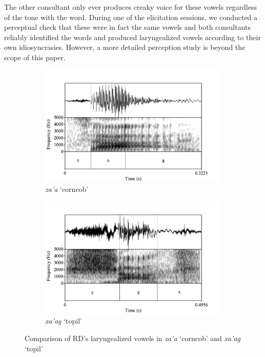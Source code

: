 \documentclass[12pt, letterpaper]{article}
\begin{document}
The other consultant only ever produces creaky voice for these vowels regardless of the tone with the word. During one of the elicitation sessions, we conducted a perceptual check that these were in fact the same vowels and both consultants reliably identified the words and produced laryngealized vowels according to their own idiosyncrasies. However, a more detailed perception study is beyond the scope of this paper. 
\begin{figure}[!h]
	\centering
	\begin{subfigure}{.5\textwidth}
		\centering
		\includegraphics[width=\linewidth]{RD_za'a.png}
		\caption{\textit{za'a} `corncob'}
		\label{fig:za'a}
	\end{subfigure}%
	\begin{subfigure}{.5\textwidth}
		\centering
		\includegraphics[width=\linewidth]{RD_xa'ag.png}
		\caption{\textit{xa'ag} `topil'}
		\label{fig:xa'ag}
	\end{subfigure}
	\caption{Comparison of RD's laryngealized vowels in \textit{za'a} `corncob' and \textit{xa'ag} `topil'}
	\label{fig:RDLaryngeal}
\end{figure}
\end{document}
